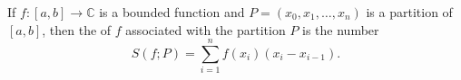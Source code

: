 If $f: [a, b] \to \mathbb{C}$ is a bounded function and $P = (x_0, x_1, \ldots, x_n)$ is a partition of $[a, b]$, then the  of $f$ associated with the partition $P$ is the number
$$S(f; P) = \sum_{i=1}^{n} f(x_i)(x_i - x_{i-1}).$$
